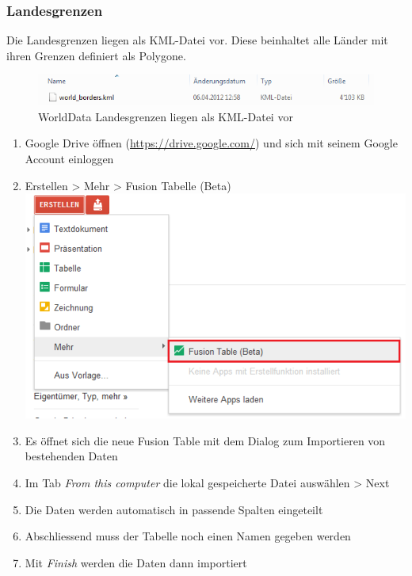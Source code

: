 \subsubsection{Landesgrenzen}
\label{landesgrenzen}
Die Landesgrenzen liegen als KML-Datei vor. Diese beinhaltet alle Länder mit ihren Grenzen definiert als Polygone.

\begin{figure}[!h]
	\centering
	\includegraphics{images/usecase1-worlddata/documentation/worlddata-worldborders_kml.png}
	\caption{WorldData Landesgrenzen liegen als KML-Datei vor}
	\label{worlddata-worldborders_kml}
\end{figure}

\begin{enumerate}
\item Google Drive öffnen (\url{https://drive.google.com/}) und sich mit seinem Google Account einloggen
\item Erstellen > Mehr > Fusion Tabelle (Beta) \\ \includegraphics{images/usecase1-worlddata/documentation/worlddata-worldborders_import1.png}
\item Es öffnet sich die neue Fusion Table mit dem Dialog zum Importieren von bestehenden Daten
\item Im Tab \emph{From this computer} die lokal gespeicherte Datei auswählen > Next
\item Die Daten werden automatisch in passende Spalten eingeteilt
\item Abschliessend muss der Tabelle noch einen Namen gegeben werden
\item Mit \emph{Finish} werden die Daten dann importiert
\end{enumerate}

